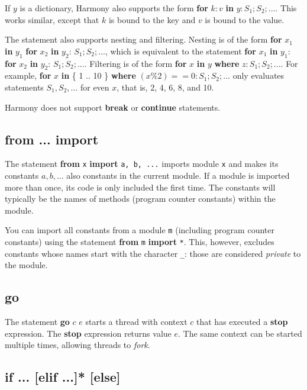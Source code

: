 \documentclass{report}
\begin{document}
If $y$ is a dictionary, Harmony also supports the form
\textbf{for} $k:v$ \textbf{in} $y: S_1; S_2; ...$.  This works similar,
except that $k$ is bound to the key and $v$ is bound to the value.

The statement also supports nesting and filtering.
Nesting is of the form
\textbf{for} $x_1$ \textbf{in} $y_1$ \textbf{for} $x_2$ \textbf{in} $y_2$:
$S_1; S_2; ...$,
which is equivalent to the statement
\textbf{for} $x_1$ \textbf{in} $y_1$: \textbf{for} $x_2$ \textbf{in} $y_2$:
$S_1; S_2; ...$.
Filtering is of the form
\textbf{for} $x$ \textbf{in} $y$ \textbf{where} $z: S_1; S_2; ...$.
For example,
\textbf{for} $x$ \textbf{in} \{ 1 .. 10 \} \textbf{where} $(x \% 2) == 0:
S_1; S_2; ...$ only evaluates statements $S_1, S_2, ...$ for even $x$,
that is, 2, 4, 6, 8, and 10.

Harmony does not support \textbf{break} or \textbf{continue} statements.

\subsection*{\textbf{from ... import}}

The statement \textbf{from} \texttt{x} \textbf{import} \texttt{a, b, ...}
imports module \texttt{x} and makes its constants $a, b, ...$ also constants
in the current module.  If a module is imported more than once, its code
is only included the first time.  The constants will typically be the
names of methods (program counter constants) within the module.

You can import all constants from a module \texttt{m}
(including program counter constants) using the statement
\textbf{from} \texttt{m} \textbf{import} \texttt{*}.
This, however, excludes constants whose names start with the character
\texttt{\_}: those are considered \emph{private} to the module.

\subsection*{\textbf{go}}

The statement \textbf{go} $c$ $e$ starts a thread with context $c$ that
has executed a \textbf{stop} expression.  The \textbf{stop} expression
returns value $e$.
The same context can be started multiple times, allowing threads to
\emph{fork}.

\subsection*{\textbf{if ... [elif ...]* [else]}}
\end{document}
